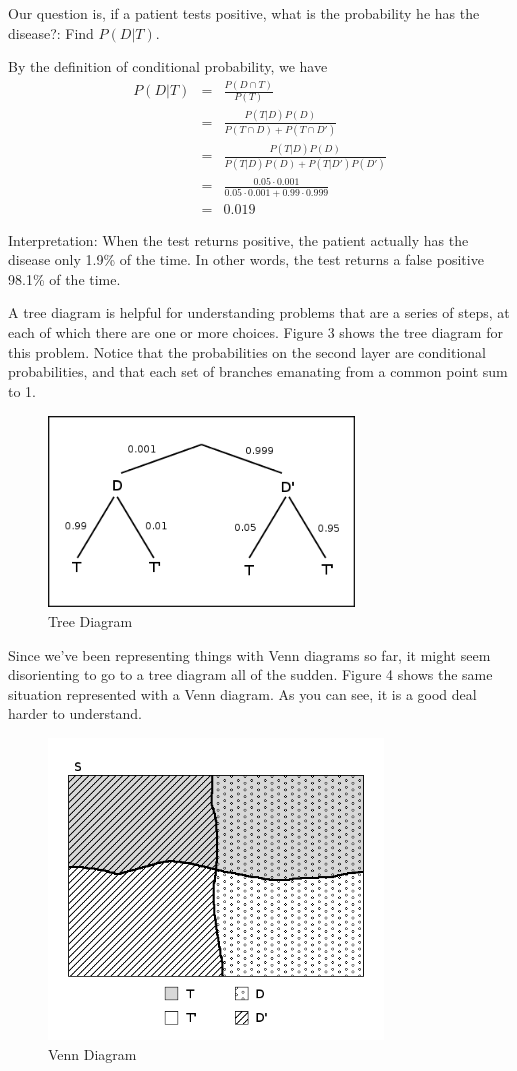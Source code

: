 \documentclass{article}
\begin{document}
Our question is, if a patient tests positive, what is the
probability he has the disease?: Find $P(D|T)$.

By the definition of conditional probability, we have
\begin{eqnarray*}
P(D|T) &=& \frac{P(D \cap T)}{P(T)}\\
&=& \frac{P(T|D)P(D)}{P(T \cap D) + P(T \cap D')}\\
&=& \frac{P(T|D)P(D)}{P(T|D)P(D) + P(T|D')P(D')}\\
&=& \frac{0.05 \cdot 0.001}{0.05 \cdot 0.001 + 0.99 \cdot
  0.999}\\
&=& 0.019
\end{eqnarray*}

Interpretation: When the test returns positive, the patient
actually has the disease only 1.9\% of the time. In other
words, the test returns a false positive 98.1\% of the time.

A tree diagram is helpful for understanding problems that
are a series of steps, at each of which there are one or
more choices. Figure 3 shows the tree diagram for this
problem. Notice that the probabilities on the second layer
are conditional probabilities, and that each set of branches
emanating from a common point sum to 1.

\begin{figure}[h]
\centering
\includegraphics[height=2in, width=3.2in]{fig-3-ex-tree.png}
\caption{Tree Diagram}
\end{figure}

Since we've been representing things with Venn diagrams so
far, it might seem disorienting to go to a tree diagram all
of the sudden. Figure 4 shows the same situation represented
with a Venn diagram. As you can see, it is a good deal
harder to understand.

\begin{figure}[h]
\centering
\includegraphics[height=3.15in, width=3.5in]{fig-4-ex-venn.png}
\caption{Venn Diagram}
\end{figure}
  
\end{document}
